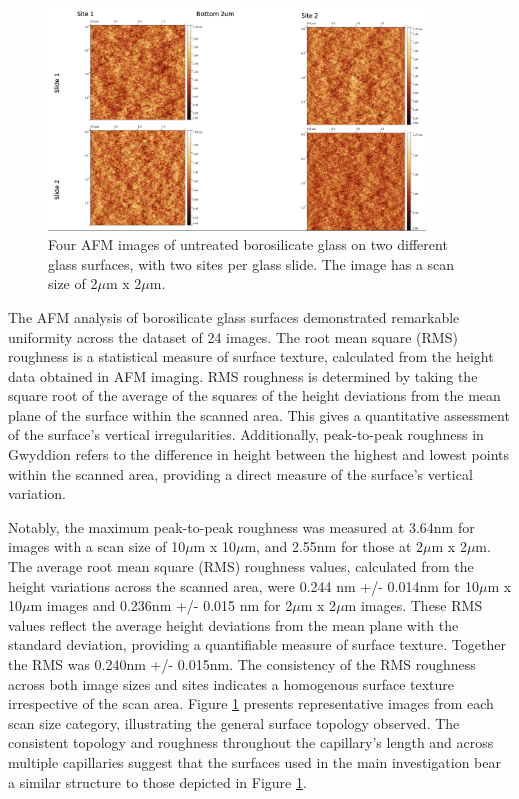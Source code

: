 \begin{figure}[h!!!!]     %
        \begin{center}
          \includegraphics[width=100mm]{chapter3/bot 2um.png}
\end{center}
\caption{Four AFM images of untreated borosilicate glass on two different glass surfaces, with two sites per glass slide. The image has a scan size of 2$\mu$m x 2$\mu$m.}
\label{fig:figure9}                 %
\end{figure}   

The AFM analysis of borosilicate glass surfaces demonstrated remarkable uniformity across the dataset of 24 images. The root mean square (RMS) roughness is a statistical measure of surface texture, calculated from the height data obtained in AFM imaging. RMS roughness is determined by taking the square root of the average of the squares of the height deviations from the mean plane of the surface within the scanned area. This gives a quantitative assessment of the surface's vertical irregularities. Additionally, peak-to-peak roughness in Gwyddion refers to the difference in height between the highest and lowest points within the scanned area, providing a direct measure of the surface's vertical variation.\cite{gwy}

Notably, the maximum peak-to-peak roughness was measured at 3.64nm for images with a scan size of 10$\mu$m x 10$\mu$m, and 2.55nm for those at 2$\mu$m x 2$\mu$m. The average root mean square (RMS) roughness values, calculated from the height variations across the scanned area, were 0.244 nm +/- 0.014nm for 10$\mu$m x 10$\mu$m images and 0.236nm +/- 0.015 nm for 2$\mu$m x 2$\mu$m images. These RMS values reflect the average height deviations from the mean plane with the standard deviation, providing a quantifiable measure of surface texture. Together the RMS was 0.240nm +/- 0.015nm. The consistency of the RMS roughness across both image sizes and sites indicates a homogenous surface texture irrespective of the scan area. Figure \ref{fig:figure9} presents representative images from each scan size category, illustrating the general surface topology observed. The consistent topology and roughness throughout the capillary's length and across multiple capillaries suggest that the surfaces used in the main investigation bear a similar structure to those depicted in Figure \ref{fig:figure9}.\cite{AFMbactPaper}
  

